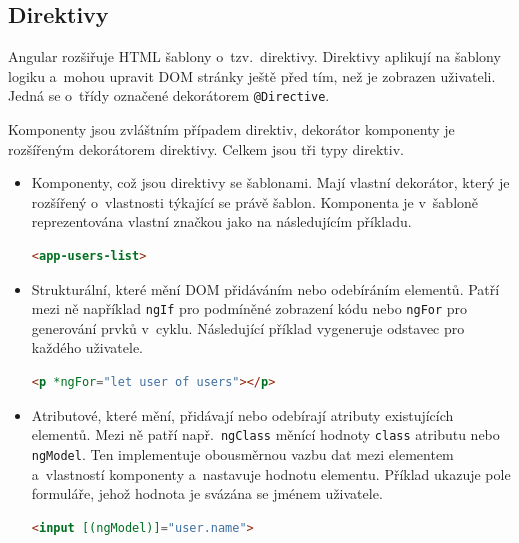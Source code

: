 \documentclass[
  digital, %
  oneside, %
  table,   %
  nolof,     %
  nolot,     %
]{fithesis3}
\begin{document}
\subsection{Direktivy}
Angular rozšiřuje HTML šablony o~tzv.~direktivy. Direktivy aplikují na šablony logiku a~mohou upravit DOM stránky ještě před tím, než je zobrazen uživateli. Jedná se o~třídy označené dekorátorem \verb|@Directive|.\par
Komponenty jsou zvláštním případem direktiv, dekorátor komponenty je rozšířeným dekorátorem direktivy. Celkem jsou tři typy direktiv. \cite{angulario}
\begin{itemize}
  \item Komponenty, což jsou direktivy se šablonami. Mají vlastní dekorátor, který je rozšířený o~vlastnosti týkající se právě šablon. Komponenta je v~šabloně reprezentována vlastní značkou jako na následujícím příkladu.
\begin{lstlisting}[showstringspaces=false,language=html]
<app-users-list>
\end{lstlisting}
  \item Strukturální, které mění DOM přidáváním nebo odebíráním elementů. Patří mezi ně například \verb|ngIf| pro podmíněné zobrazení kódu nebo \verb|ngFor| pro generování prvků v~cyklu. Následující příklad vygeneruje odstavec pro každého uživatele.
\begin{lstlisting}[showstringspaces=false,language=html]
<p *ngFor="let user of users"></p>
\end{lstlisting}
  \item Atributové, které mění, přidávají nebo odebírají atributy existujících elementů. Mezi ně patří např.~\verb|ngClass| měnící hodnoty \verb|class| atributu nebo \verb|ngModel|. Ten implementuje obousměrnou vazbu dat mezi elementem a~vlastností komponenty a~nastavuje hodnotu elementu. Příklad ukazuje pole formuláře, jehož hodnota je svázána se jménem uživatele.
\begin{lstlisting}[showstringspaces=false,language=html]
<input [(ngModel)]="user.name">
\end{lstlisting}
\end{itemize}
\end{document}
